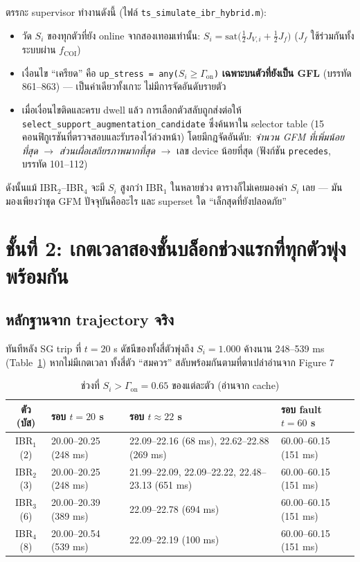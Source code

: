 \documentclass[11pt,a4paper]{article}
\newcommand{\code}[1]{\texttt{\small #1}}
\begin{document}
ตรรกะ supervisor ทำงานดังนี้ (ไฟล์ \code{ts\_simulate\_ibr\_hybrid.m}):
\begin{itemize}
\item วัด $S_i$ ของทุกตัวที่ยัง online จากสองเทอมเท่านั้น:
      $S_i = \mathrm{sat}\bigl(\tfrac{1}{2}J_{V,i} + \tfrac{1}{2}J_f\bigr)$
      ($J_f$ ใช้ร่วมกันทั้งระบบผ่าน $f_{\mathrm{COI}}$)
\item เงื่อนไข ``เครียด'' คือ
      \code{up\_stress = any(}$S_i \geq \Gamma_{\mathrm{on}}$\code{)}
      \textbf{เฉพาะบนตัวที่ยังเป็น GFL} (บรรทัด 861--863) —
      เป็นค่าเดียวทั้งเกาะ ไม่มีการจัดอันดับรายตัว
\item เมื่อเงื่อนไขติดและครบ dwell แล้ว การเลือกตัวสลับถูกส่งต่อให้
      \code{select\_support\_augmentation\_candidate} ซึ่งค้นหาใน
      selector table (15 คอนฟิกูเรชันที่ตรวจสอบและรับรองไว้ล่วงหน้า)
      โดยมีกฎจัดอันดับ: \emph{จำนวน GFM ที่เพิ่มน้อยที่สุด} $\to$
      \emph{ส่วนเผื่อเสถียรภาพมากที่สุด} $\to$ เลข device น้อยที่สุด
      (ฟังก์ชัน \code{precedes}, บรรทัด 101--112)
\end{itemize}

ดังนั้นแม้ IBR$_2$--IBR$_4$ จะมี $S_i$ สูงกว่า IBR$_1$ ในหลายช่วง
ตารางก็ไม่เคยมองค่า $S_i$ เลย — มันมองเพียงว่าชุด GFM ปัจจุบันคืออะไร
และ superset ใด ``เล็กสุดที่ยังปลอดภัย''

\section{ชั้นที่ 2: เกตเวลาสองชั้นบล็อกช่วงแรกที่ทุกตัวพุ่งพร้อมกัน}

\subsection{หลักฐานจาก trajectory จริง}
ทันทีหลัง SG trip ที่ $t = 20$ s ดัชนีของทั้งสี่ตัวพุ่งถึง $S_i = 1.000$
ค้างนาน 248--539 ms (Table~\ref{tab:excursions}) หากไม่มีเกตเวลา
ทั้งสี่ตัว ``สมควร'' สลับพร้อมกันตามที่ตาเปล่าอ่านจาก Figure 7

\begin{table}[h]
\centering\small
\caption{ช่วงที่ $S_i > \Gamma_{\mathrm{on}} = 0.65$ ของแต่ละตัว (อ่านจาก cache)}
\label{tab:excursions}
\begin{tabular}{@{}clll@{}}
\toprule
ตัว (บัส) & รอบ $t = 20$ s & รอบ $t \approx 22$ s & รอบ fault $t = 60$ s \\
\midrule
IBR$_1$ (2) & 20.00--20.25 (248 ms) & 22.09--22.16 (68 ms), 22.62--22.88 (269 ms) & 60.00--60.15 (151 ms) \\
IBR$_2$ (3) & 20.00--20.25 (248 ms) & 21.99--22.09, 22.09--22.22, 22.48--23.13 (651 ms) & 60.00--60.15 (151 ms) \\
IBR$_3$ (6) & 20.00--20.39 (389 ms) & 22.09--22.78 (694 ms) & 60.00--60.15 (151 ms) \\
IBR$_4$ (8) & 20.00--20.54 (539 ms) & 22.09--22.19 (100 ms) & 60.00--60.15 (151 ms) \\
\bottomrule
\end{tabular}
\end{table}
\end{document}
